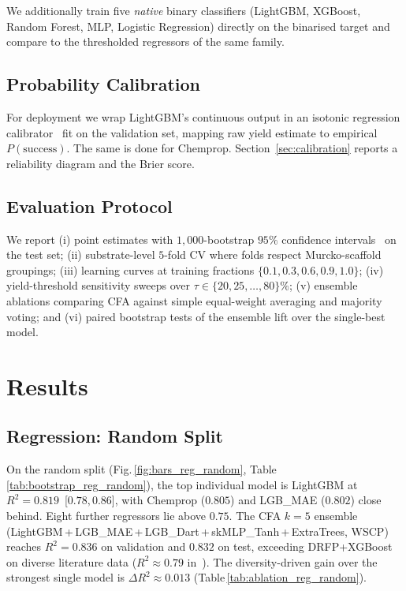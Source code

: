 \documentclass[conference]{IEEEtran}
\begin{document}
We additionally train five \emph{native} binary classifiers (LightGBM,
XGBoost, Random Forest, MLP, Logistic Regression) directly on the binarised
target and compare to the thresholded regressors of the same family.

\subsection{Probability Calibration}
For deployment we wrap LightGBM's continuous output in an isotonic regression
calibrator~\cite{Niculescu2005} fit on the validation set, mapping raw yield
estimate to empirical $P(\mathrm{success})$. The same is done for Chemprop.
Section~\ref{sec:calibration} reports a reliability diagram and the Brier
score.

\subsection{Evaluation Protocol}
We report (i) point estimates with $1{,}000$-bootstrap $95\%$ confidence
intervals~\cite{Efron1979} on the test set; (ii) substrate-level $5$-fold
CV where folds respect Murcko-scaffold groupings; (iii) learning curves at
training fractions $\{0.1, 0.3, 0.6, 0.9, 1.0\}$; (iv) yield-threshold
sensitivity sweeps over $\tau\!\in\!\{20,25,\ldots,80\}\%$; (v) ensemble
ablations comparing CFA against simple equal-weight averaging and majority
voting; and (vi) paired bootstrap tests of the ensemble lift over the
single-best model.

\section{Results}
\label{sec:results}

\subsection{Regression: Random Split}
On the random split (Fig.\,\ref{fig:bars_reg_random},
Table\,\ref{tab:bootstrap_reg_random}), the top individual model is LightGBM
at $R^{2}\!=\!0.819$~[$0.78,0.86$], with Chemprop ($0.805$) and LGB\_MAE
($0.802$) close behind. Eight further regressors lie above $0.75$. The CFA
$k\!=\!5$ ensemble (LightGBM\,+\,LGB\_MAE\,+\,LGB\_Dart\,+\,skMLP\_Tanh\,+\,ExtraTrees,
\textsc{WSCP}) reaches $R^{2}\!=\!0.836$ on validation and $0.832$ on test,
exceeding DRFP+XGBoost on diverse literature data ($R^{2}\!\approx\!0.79$
in~\cite{Probst2022}). The diversity-driven gain over the strongest single
model is $\Delta R^{2}\!\approx\!0.013$
(Table\,\ref{tab:ablation_reg_random}).
\end{document}
